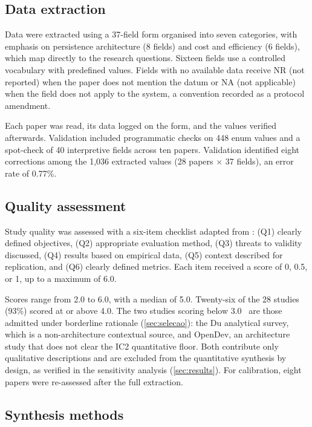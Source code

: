 \subsection{Data extraction}
\label{sec:extraction}

Data were extracted using a 37-field form organised into seven
categories, with emphasis on persistence architecture (8 fields) and
cost and efficiency (6 fields), which map directly to the research
questions.
Sixteen fields use a controlled vocabulary with predefined values.
Fields with no available data receive NR (not reported) when the paper
does not mention the datum or NA (not applicable) when the field does
not apply to the system, a convention recorded as a protocol amendment.

Each paper was read, its data logged on the form, and the values
verified afterwards.
Validation included programmatic checks on 448 enum values and a
spot-check of 40 interpretive fields across ten papers.
Validation identified eight corrections among the 1{,}036 extracted
values (28 papers $\times$ 37 fields), an error rate of 0.77\%.

\subsection{Quality assessment}
\label{sec:quality}

Study quality was assessed with a six-item checklist adapted from
\citet{kitchenham2007guidelines}: (Q1) clearly defined objectives,
(Q2) appropriate evaluation method, (Q3) threats to validity discussed,
(Q4) results based on empirical data, (Q5) context described for
replication, and (Q6) clearly defined metrics.
Each item received a score of 0, 0.5, or 1, up to a maximum of 6.0.

Scores range from 2.0 to 6.0, with a median of 5.0.
Twenty-six of the 28 studies (93\%) scored at or above 4.0.
The two studies scoring below
3.0~\citep{bui2026opendev,du2026memory} are those admitted under
borderline rationale (\autoref{sec:selecao}): the Du analytical survey,
which is a non-architecture contextual source, and OpenDev, an
architecture study that does not clear the IC2 quantitative floor.
Both contribute only qualitative descriptions and are excluded from the
quantitative synthesis by design, as verified in the sensitivity
analysis (\autoref{sec:results}).
For calibration, eight papers were re-assessed after the full extraction.

\subsection{Synthesis methods}
\label{sec:synthesis}

